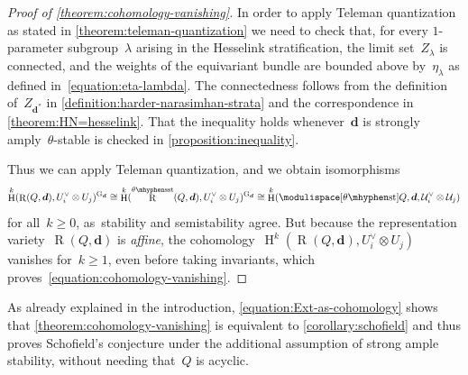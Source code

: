 \documentclass[JEP,XML,SOM,Unicode,NoEqCountersInSection,published]{cedram}
\theoremstyle{plain}
\theoremstyle{definition}
\DeclareMathOperator\HH{H}
\DeclareMathOperator\Rep{R}
\newcommand\group[1][\tuple{d}]{\mathrm{G}_{#1}}
\newcommand\limitset[1][\lambda]{Z_{#1}}
\newcommand\semistable{\ensuremath{\mhyphen\mathrm{sst}}}
\newcommand\stable{\ensuremath{\mhyphen\mathrm{st}}}
\newcommand\tuple[1]{\ensuremath{{\boldsymbol{#1}}}}
\begin{document}
\begin{proof}[Proof of \cref{theorem:cohomology-vanishing}]
In order to apply Teleman quantization
as stated in \cref{theorem:teleman-quantization}
we need to check that,
for every $1$-parameter subgroup~$\lambda$
arising in the Hesselink stratification,
the limit set~$\limitset$ is connected,
and the weights of the equivariant bundle are bounded above by~$\eta_\lambda$ as defined in~\eqref{equation:eta-lambda}.
The connectedness follows from the definition of~$\limitset[{\tuple{d}^*}]$
in \cref{definition:harder-narasimhan-strata}
and the correspondence in \cref{theorem:HN=hesselink}.
That the inequality holds whenever~$\tuple{d}$ is strongly amply~$\theta$-stable
is checked in \cref{proposition:inequality}.

Thus we can apply Teleman quantization,
and we obtain isomorphisms
\begin{equation*}
\HH^k(\Rep(Q,\tuple{d}),U_i^\vee\otimes U_j)^{\group}
\cong
\HH^k(\Rep^{\theta\semistable}(Q,\tuple{d}),U_i^\vee\otimes U_j)^{\group}
\cong
\HH^k(\modulispace[\theta\stable]{Q,\tuple{d}},\mathcal{U}_i^\vee\otimes\mathcal{U}_j)
\end{equation*}
for all~$k\geq 0$, as~stability and semistability agree.
But because the representation variety~$\Rep(Q,\tuple{d})$ is \emph{affine},
the cohomology~$\HH^k(\Rep(Q,\tuple{d}),U_i^\vee\otimes U_j)$ vanishes for~$k\geq 1$,
even before taking invariants,
which proves~\eqref{equation:cohomology-vanishing}.
\end{proof}

As already explained in the introduction,
\eqref{equation:Ext-as-cohomology} shows that \cref{theorem:cohomology-vanishing}
is equivalent to \cref{corollary:schofield}
and thus proves Schofield's conjecture
under the additional assumption of strong ample stability,
without needing that~$Q$ is acyclic.
\end{document}
